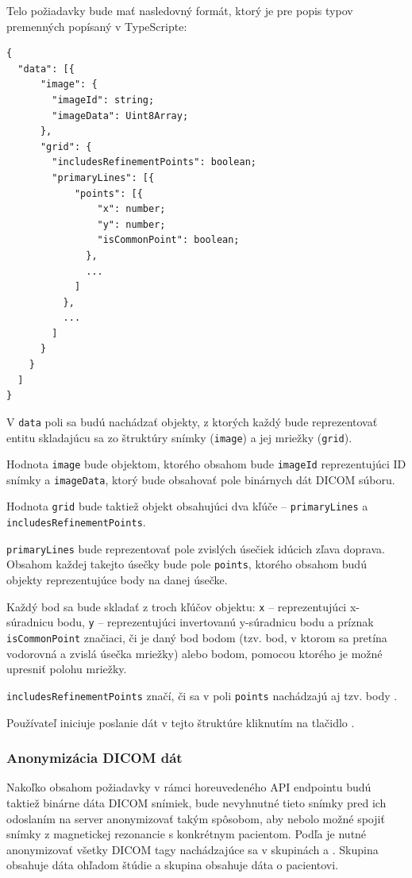 Telo požiadavky bude mať nasledovný formát, ktorý je pre popis typov premenných popísaný v TypeScripte:

\begin{minipage}[]{\linewidth}
\begin{verbatim}
{
  "data": [{
      "image": {
        "imageId": string;
        "imageData": Uint8Array;
      },
      "grid": {
        "includesRefinementPoints": boolean;
        "primaryLines": [{
            "points": [{
                "x": number;
                "y": number;
                "isCommonPoint": boolean;
              },
              ...
            ]
          },
          ...
        ]
      }
    }
  ]
}
\end{verbatim}
\end{minipage}

V \texttt{data} poli sa budú nachádzať objekty, z ktorých každý bude reprezentovať entitu skladajúcu sa zo štruktúry snímky (\texttt{image}) a jej mriežky (\texttt{grid}).

Hodnota \texttt{image} bude objektom, ktorého obsahom bude \texttt{imageId} reprezentujúci ID snímky a \texttt{imageData}, ktorý bude obsahovať pole binárnych dát DICOM súboru.

Hodnota \texttt{grid} bude taktiež objekt obsahujúci dva kľúče -- \texttt{primaryLines} a \newline \texttt{includesRefinementPoints}.

\texttt{primaryLines} bude reprezentovať pole zvislých úsečiek idúcich zľava doprava.
Obsahom každej takejto úsečky bude pole \texttt{points}, ktorého obsahom budú objekty reprezentujúce body na danej úsečke.

Každý bod sa bude skladať z troch kľúčov objektu: \texttt{x} -- reprezentujúci x-súradnicu bodu, \texttt{y} -- reprezentujúci invertovanú y-súradnicu bodu a príznak \texttt{isCommonPoint} značiaci, či je daný bod  bodom (tzv. bod, v ktorom sa pretína vodorovná a zvislá úsečka mriežky) alebo  bodom, pomocou ktorého je možné upresniť polohu mriežky. 

\texttt{includesRefinementPoints} značí, či sa v poli \texttt{points} nachádzajú aj tzv.  body .

Používateľ iniciuje poslanie dát v tejto štruktúre kliknutím na tlačidlo .

\subsubsection {Anonymizácia DICOM dát}
Nakoľko obsahom požiadavky v rámci horeuvedeného API endpointu budú taktiež binárne dáta DICOM snímiek, bude nevyhnutné tieto snímky pred ich odoslaním na server anonymizovať takým spôsobom, aby nebolo možné spojiť snímky z magnetickej rezonancie s konkrétnym pacientom. Podľa \cite{Varma_2012} je nutné anonymizovať všetky DICOM tagy nachádzajúce sa v skupinách  a . Skupina  obsahuje dáta ohľadom štúdie a skupina  obsahuje dáta o pacientovi.

